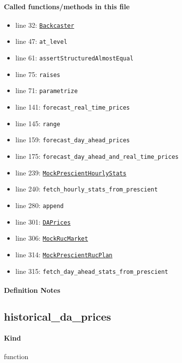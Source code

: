 \documentclass[11pt]{report}
\begin{document}
\paragraph{Called functions/methods in this file}
\begin{itemize}[leftmargin=*]
  \item line 32: \hyperref[def:forecaster.py:Backcaster:L321]{\texttt{Backcaster}}
  \item line 47: \texttt{at\_level}
  \item line 61: \texttt{assertStructuredAlmostEqual}
  \item line 75: \texttt{raises}
  \item line 71: \texttt{parametrize}
  \item line 141: \texttt{forecast\_real\_time\_prices}
  \item line 145: \texttt{range}
  \item line 159: \texttt{forecast\_day\_ahead\_prices}
  \item line 175: \texttt{forecast\_day\_ahead\_and\_real\_time\_prices}
  \item line 239: \hyperref[def:tests-test_backcaster.py:MockPrescientHourlyStats:L231]{\texttt{MockPrescientHourlyStats}}
  \item line 240: \texttt{fetch\_hourly\_stats\_from\_prescient}
  \item line 280: \texttt{append}
  \item line 301: \hyperref[def:tests-test_backcaster.py:DAPrices:L290]{\texttt{DAPrices}}
  \item line 306: \hyperref[def:tests-test_backcaster.py:MockRucMarket:L299]{\texttt{MockRucMarket}}
  \item line 314: \hyperref[def:tests-test_backcaster.py:MockPrescientRucPlan:L304]{\texttt{MockPrescientRucPlan}}
  \item line 315: \texttt{fetch\_day\_ahead\_stats\_from\_prescient}
\end{itemize}
\paragraph{Definition Notes}
\subsection{historical\_da\_prices}
\label{def:tests-test_backcaster.py:historical_da_prices:L21}
\paragraph{Kind} function
\end{document}
